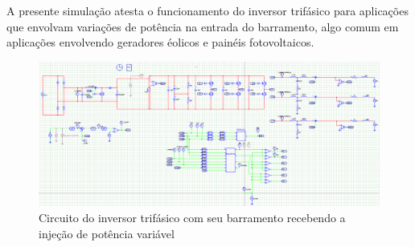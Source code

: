 A presente simulação atesta o funcionamento do inversor trifásico para aplicações que envolvam 
variações de potência na entrada do barramento, algo comum em aplicações envolvendo geradores 
éolicos e painéis fotovoltaicos.

\begin{figure}[!hbt]
	\begin{center}
    \includegraphics[width=\textwidth]{figuras/sim_figures/inversor_e_boost_variavel/esquematico.PNG}
    \caption{Circuito do inversor trifásico com seu barramento recebendo a injeção de potência variável}
    \label{fig:sim-controle-corrente-esq}
    \end{center}
\end{figure}

